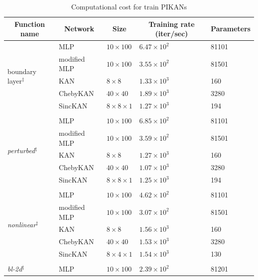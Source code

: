 \begin{table}[ht]
\caption{Computational cost for train PIKANs}
\label{table:cost for pikans}
\begin{center}
\begin{tabular}{lllll}
\multicolumn{1}{c}{\bf Function name}  & \multicolumn{1}{c}{\bf Network}& \multicolumn{1}{c}{\bf Size}  & \multicolumn{1}{c}{\bf Training rate (iter/sec)} & \multicolumn{1}{c}{\bf Parameters} \\ 
\hline 
\multirow{5}{*}{boundary layer$^\ddag$ } & MLP &$10\times 100$ & $6.47\times 10^{2}$ & 81101 \\
                      & modified MLP & $10\times 100$ &$3.55\times 10^{2}$ & 81501\\ 
                      & KAN & $8\times 8$  &$1.33\times 10^{3}$ & 160\\ 
                      & ChebyKAN & $40\times 40$ & $1.89\times 10^{3}$  & 3280\\ 
                      & SincKAN & $8\times 8 \times 1$ & $1.27\times 10^{3}$  & 194 \\ 
\\
\multirow{5}{*}{\textit{perturbed}$^\ddag$ } & MLP & $10\times 100$ & $6.85\times 10^{2}$ & 81101 \\ 
                      & modified MLP &$10\times 100$ & $3.59\times 10^{2}$ & 81501\\ 
                      & KAN & $8\times 8$ & $1.27\times 10^{3}$ & 160\\ 
                      & ChebyKAN & $40\times 40$ & $1.07\times 10^{3}$ & 3280 \\ 
                      & SincKAN & $8\times 8 \times 1$ & $1.25\times 10^{3}$ &194 \\ 
\\
\multirow{5}{*}{\textit{nonlinear}$^\ddag$ } & MLP & $10\times 100$ & $4.62\times 10^{2}$ & 81101\\ 
                      & modified MLP & $10\times 100$ & $3.07\times 10^{2}$ & 81501\\ 
                      & KAN & $8\times 8$ & $1.56\times 10^{3}$ & 160\\ 
                      & ChebyKAN & $40\times 40$ & $1.53\times 10^{3}$ & 3280 \\ 
                      & SincKAN & $8\times 4 \times 1$ & $1.54\times 10^{3}$ & 130 \\ 
\\
\multirow{5}{*}{\textit{bl-2d}$^\ddag$ } & MLP & $10\times 100$ & $2.39\times 10^{2}$ & 81201\\ 

\end{tabular}
\end{center}
\end{table}
